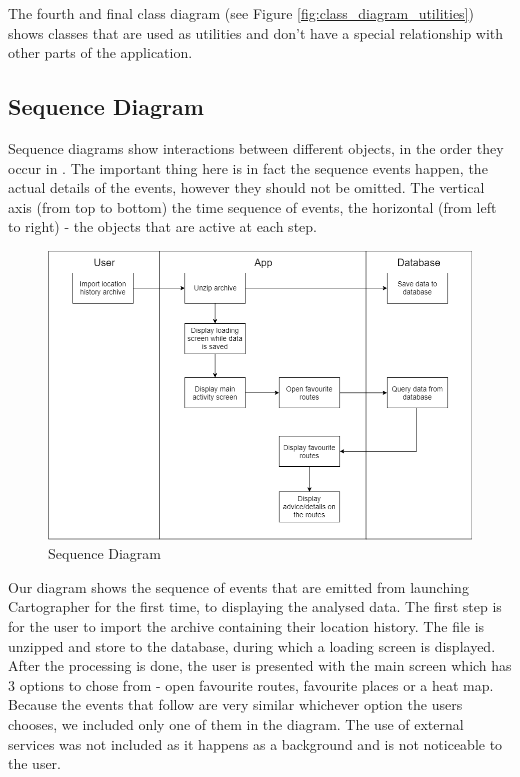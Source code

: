 \documentclass[12p]{article}
\begin{document}
    The fourth and final class diagram (see Figure \ref{fig:class_diagram_utilities}) shows classes that are used as utilities and don't have a special relationship with other parts of the application.
    
    \newpage
    \subsection{Sequence Diagram}
    Sequence diagrams show interactions between different objects, in the order they occur in \cite{SequenceDiagram}. The important thing here is in fact the sequence events happen, the actual details of the events, however they should not be omitted. The vertical axis (from top to bottom) the time sequence of events, the horizontal (from left to right) - the objects that are active at each step.
    
    \begin{figure}[H]
        \center
        \includegraphics[width=1.0\textwidth,keepaspectratio]{pics/diagrams/SequenceDiagram.png}
	    \caption{Sequence Diagram}
    \end{figure}
    
    Our diagram shows the sequence of events that are emitted from launching Cartographer for the first time, to displaying the analysed data. The first step is for the user to import the archive containing their location history. The file is unzipped and store to the database, during which a loading screen is displayed.
    After the processing is done, the user is presented with the main screen which has 3 options to chose from - open favourite routes, favourite places or a heat map. Because the events that follow are very similar whichever option the users chooses, we included only one of them in the diagram. The use of external services was not included as it happens as a background and is not noticeable to the user.
    
\end{document}
